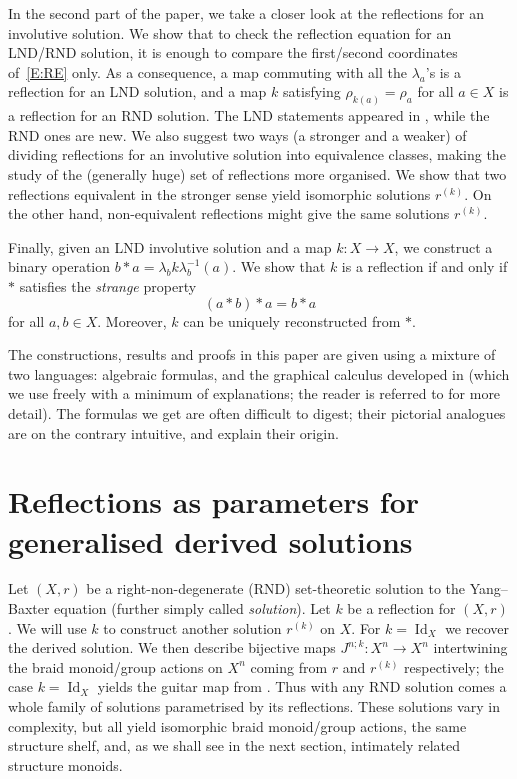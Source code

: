 \documentclass{amsart}
\newcommand{\Id}{\operatorname{Id}}
\theoremstyle{plain}
\theoremstyle{definition}
\theoremstyle{remark}
\begin{document}
In the second part of the paper, we take a closer look at the reflections for an involutive solution. We show that to check the reflection equation for an LND/RND solution, it is enough to compare the first/second coordinates of~\eqref{E:RE} only. As a consequence, a map commuting with all the $\lambda_a$'s is a reflection for an LND solution, and a map $k$ satisfying $\rho_{k(a)}=\rho_a$ for all $a \in X$ is a reflection for an RND solution. The LND statements appeared in \cite{SVW18}, while the RND ones are new. We also suggest two ways (a stronger and a weaker) of dividing reflections for an involutive solution into equivalence classes, making the study of the (generally huge) set of reflections more organised. We show that two reflections equivalent in the stronger sense yield isomorphic solutions $r^{(k)}$. On the other hand, non-equivalent reflections might give the same solutions $r^{(k)}$. 

Finally, given an LND involutive solution and a map $k \colon X \to X$, we construct a binary operation $b \ast a= \lambda_b k \lambda_b^{-1} (a)$. We show that $k$ is a reflection if and only if $\ast$ satisfies the \emph{strange} property
\[(a \ast b) \ast a = b \ast a\]
for all $a,b \in X$. Moreover, $k$ can be uniquely reconstructed from $\ast$.

The constructions, results and proofs in this paper are given using a mixture of two languages: algebraic formulas, and the graphical calculus developed in \cite{LebVen} (which we use freely with a minimum of explanations; the reader is referred to \cite{LebVen} for more detail). The formulas we get are often difficult to digest; their pictorial analogues are on the contrary intuitive, and explain their origin.



\section{Reflections as parameters for generalised derived solutions}

Let $(X,r)$ be a right-non-degenerate (RND) set-theoretic solution to the Yang--Baxter equation (further simply called \emph{solution}). Let $k$ be a reflection for $(X,r)$. We will use $k$ to construct another solution $r^{(k)}$ on $X$. For $k=\Id_X$ we recover the derived solution. We then describe bijective maps $J^{n;k} \colon X^{ n} \to X^{ n}$ intertwining the braid monoid/group actions on $X^{ n}$ coming from $r$ and $r^{(k)}$ respectively; the case $k=\Id_X$ yields the guitar map from \cite{Sol,LYZ,LebVen}. Thus with any RND solution comes a whole family of solutions parametrised by its reflections. These solutions vary in complexity, but all yield isomorphic braid monoid/group actions, the same structure shelf, and, as we shall see in the next section, intimately related structure monoids. %
\end{document}
